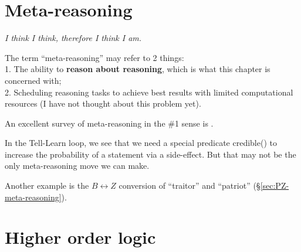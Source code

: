 



\section{Meta-reasoning}
\begin{flushright}
\emph{I think I think, therefore I think I am.}
\end{flushright}

The term ``meta-reasoning'' may refer to 2 things:\\
1. The ability to \textbf{reason about reasoning}, which is what this chapter is concerned with;\\
2. Scheduling reasoning tasks to achieve best results with limited computational resources (I have not thought about this problem yet).

An excellent survey of meta-reasoning in the \#1 sense is \citep*{Constantini2002}.

In the Tell-Learn loop, we see that we need a special predicate credible() to increase the probability of a statement via a side-effect.  But that may not be the only meta-reasoning move we can make.

Another example is the $B \leftrightarrow Z$ conversion of ``traitor'' and ``patriot'' (\S\ref{sec:PZ-meta-reasoning}).

\section{Higher order logic}
\label{sec:HOL}

